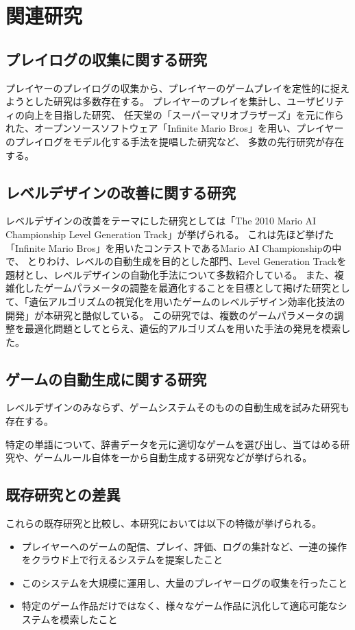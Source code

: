 \chapter{関連研究}
\section{プレイログの収集に関する研究}
プレイヤーのプレイログの収集から、プレイヤーのゲームプレイを定性的に捉えようとした研究は多数存在する。
プレイヤーのプレイを集計し、ユーザビリティの向上を目指した研究\cite{metrics}\cite{usability}、
任天堂の「スーパーマリオブラザーズ」を元に作られた、オープンソースソフトウェア「Infinite Mario Bros」\cite{mario}を用い、プレイヤーのプレイログをモデル化する手法を提唱した研究\cite{model}\cite{optimization}など、
多数の先行研究が存在する。

\section{レベルデザインの改善に関する研究}
レベルデザインの改善をテーマにした研究としては「The 2010 Mario AI Championship Level Generation Track」\cite{level}が挙げられる。
これは先ほど挙げた「Infinite Mario Bros」を用いたコンテストであるMario AI Championship\cite{champion}の中で、
とりわけ、レベルの自動生成を目的とした部門、Level Generation Trackを題材とし、レベルデザインの自動化手法について多数紹介している。
また、複雑化したゲームパラメータの調整を最適化することを目標として掲げた研究として、「遺伝アルゴリズムの視覚化を用いたゲームのレベルデザイン効率化技法の開発」\cite{ga}が本研究と酷似している。
この研究では、複数のゲームパラメータの調整を最適化問題としてとらえ、遺伝的アルゴリズムを用いた手法の発見を模索した。

\section{ゲームの自動生成に関する研究}
レベルデザインのみならず、ゲームシステムそのものの自動生成を試みた研究も存在する。

特定の単語について、辞書データを元に適切なゲームを選び出し、当てはめる研究\cite{auto}や、ゲームルール自体を一から自動生成する研究\cite{gamedesign}などが挙げられる。


\section{既存研究との差異}
これらの既存研究と比較し、本研究においては以下の特徴が挙げられる。

\begin{itemize}
  \item プレイヤーへのゲームの配信、プレイ、評価、ログの集計など、一連の操作をクラウド上で行えるシステムを提案したこと
  \item このシステムを大規模に運用し、大量のプレイヤーログの収集を行ったこと
  \item 特定のゲーム作品だけではなく、様々なゲーム作品に汎化して適応可能なシステムを模索したこと
\end{itemize}

